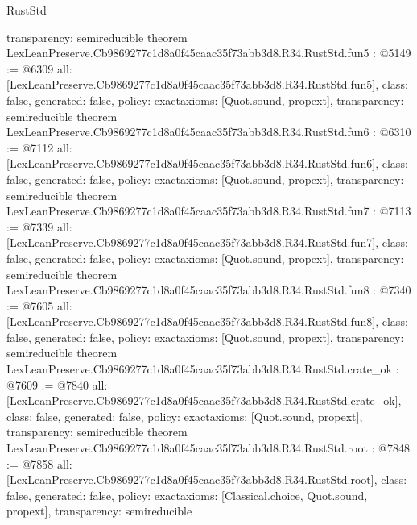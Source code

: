 \begin{lexlean}{RustStd}
\begin{coremodule}
{  transparency: semireducible
}
theorem LexLeanPreserve.Cb9869277c1d8a0f45caac35f73abb3d8.R34.RustStd.fun5 : @5149 := @6309 {
  all: [LexLeanPreserve.Cb9869277c1d8a0f45caac35f73abb3d8.R34.RustStd.fun5],
  class: false,
  generated: false,
  policy: exact{axioms: [Quot.sound, propext]},
  transparency: semireducible
}
theorem LexLeanPreserve.Cb9869277c1d8a0f45caac35f73abb3d8.R34.RustStd.fun6 : @6310 := @7112 {
  all: [LexLeanPreserve.Cb9869277c1d8a0f45caac35f73abb3d8.R34.RustStd.fun6],
  class: false,
  generated: false,
  policy: exact{axioms: [Quot.sound, propext]},
  transparency: semireducible
}
theorem LexLeanPreserve.Cb9869277c1d8a0f45caac35f73abb3d8.R34.RustStd.fun7 : @7113 := @7339 {
  all: [LexLeanPreserve.Cb9869277c1d8a0f45caac35f73abb3d8.R34.RustStd.fun7],
  class: false,
  generated: false,
  policy: exact{axioms: [Quot.sound, propext]},
  transparency: semireducible
}
theorem LexLeanPreserve.Cb9869277c1d8a0f45caac35f73abb3d8.R34.RustStd.fun8 : @7340 := @7605 {
  all: [LexLeanPreserve.Cb9869277c1d8a0f45caac35f73abb3d8.R34.RustStd.fun8],
  class: false,
  generated: false,
  policy: exact{axioms: [Quot.sound, propext]},
  transparency: semireducible
}
theorem LexLeanPreserve.Cb9869277c1d8a0f45caac35f73abb3d8.R34.RustStd.crate_ok : @7609 := @7840 {
  all: [LexLeanPreserve.Cb9869277c1d8a0f45caac35f73abb3d8.R34.RustStd.crate_ok],
  class: false,
  generated: false,
  policy: exact{axioms: [Quot.sound, propext]},
  transparency: semireducible
}
theorem LexLeanPreserve.Cb9869277c1d8a0f45caac35f73abb3d8.R34.RustStd.root : @7848 := @7858 {
  all: [LexLeanPreserve.Cb9869277c1d8a0f45caac35f73abb3d8.R34.RustStd.root],
  class: false,
  generated: false,
  policy: exact{axioms: [Classical.choice, Quot.sound, propext]},
  transparency: semireducible
}


\end{coremodule}
\end{lexlean}
